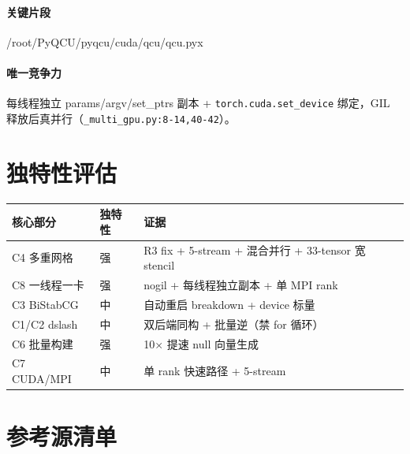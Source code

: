 \documentclass[UTF8]{ctexart}
\begin{document}
\paragraph{关键片段}
\begin{lstinputlisting}[firstline=10,lastline=16,language=python]{/root/PyQCU/pyqcu/cuda/qcu/qcu.pyx}
\end{lstinputlisting}
\paragraph{唯一竞争力} 每线程独立 params/argv/set\_ptrs 副本 + \texttt{torch.cuda.set\_device} 绑定，GIL 释放后真并行（\texttt{\_multi\_gpu.py:8-14,40-42}）。

\section{独特性评估}

\begin{xltabular}{\textwidth}{llX}
\toprule
\textcolor{struct}{核心部分} & 独特性 & 证据 \\
\midrule
\endhead
C4 多重网格 & 强 & R3 fix + 5-stream + 混合并行 + 33-tensor 宽 stencil \\
C8 一线程一卡 & 强 & nogil + 每线程独立副本 + 单 MPI rank \\
C3 BiStabCG & 中 & 自动重启 breakdown + device 标量 \\
C1/C2 dslash & 中 & 双后端同构 + 批量逆（禁 for 循环） \\
C6 批量构建 & 强 & 10× 提速 null 向量生成 \\
C7 CUDA/MPI & 中 & 单 rank 快速路径 + 5-stream \\
\bottomrule
\end{xltabular}

\section{参考源清单}
\end{document}
